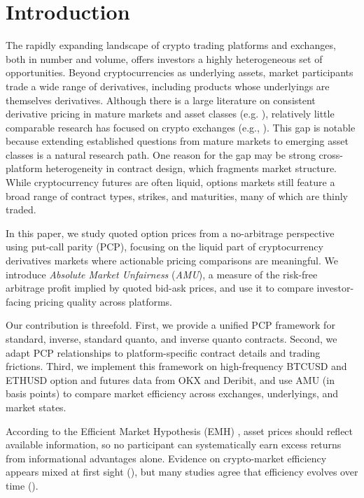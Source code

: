 \documentclass[12pt]{article}
\begin{document}
\section{Introduction}

The rapidly expanding landscape of crypto trading platforms and exchanges, both in number and volume, offers investors a highly heterogeneous set of opportunities. Beyond cryptocurrencies as underlying assets, market participants trade a wide range of derivatives, including products whose underlyings are themselves derivatives. Although there is a large literature on consistent derivative pricing in mature markets and asset classes (e.g. \cite{BlackScholes1973, sharma2024review}), relatively little comparable research has focused on crypto exchanges (e.g., \cite{alexander2023crypto, lucic2024valuation}). This gap is notable because extending established questions from mature markets to emerging asset classes is a natural research path. One reason for the gap may be strong cross-platform heterogeneity in contract design, which fragments market structure. While cryptocurrency futures are often liquid, options markets still feature a broad range of contract types, strikes, and maturities, many of which are thinly traded.

In this paper, we study quoted option prices from a no-arbitrage perspective using put-call parity (PCP), focusing on the liquid part of cryptocurrency derivatives markets where actionable pricing comparisons are meaningful. We introduce \textit{Absolute Market Unfairness} (\textit{AMU}), a measure of the risk-free arbitrage profit implied by quoted bid-ask prices, and use it to compare investor-facing pricing quality across platforms.

Our contribution is threefold. First, we provide a unified PCP framework for standard, inverse, standard quanto, and inverse quanto contracts. Second, we adapt PCP relationships to platform-specific contract details and trading frictions. Third, we implement this framework on high-frequency BTCUSD and ETHUSD option and futures data from OKX and Deribit, and use AMU (in basis points) to compare market efficiency across exchanges, underlyings, and market states.

According to the Efficient Market Hypothesis (EMH) \citep{fama1970efficient}, asset prices should reflect available information, so no participant can systematically earn excess returns from informational advantages alone. Evidence on crypto-market efficiency appears mixed at first sight (\citep{urquhart2016inefficiency, le2020efficiency, kristoufek2018bitcoin, nan2019market, kochling2019does, vidal2019weak, wei2018liquidity, noda2021evolution}), but many studies agree that efficiency evolves over time (\citep{urquhart2016inefficiency, le2020efficiency, kochling2019does, vidal2019weak, wei2018liquidity}).
\end{document}
